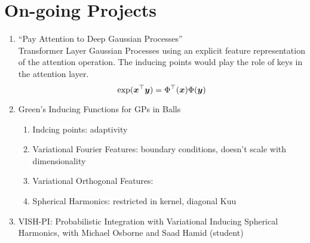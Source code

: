 \section{On-going Projects}

\begin{enumerate}
    \item ``Pay Attention to Deep Gaussian Processes''\\
    Transformer Layer Gaussian Processes using an explicit feature representation of the attention operation. The inducing points would play the role of keys in the attention layer.
    \begin{equation*}
        \exp(\bm{x}^\top \bm{y}) = \Phi^\top(\bm{x}) \Phi(\bm{y})
    \end{equation*}
    \item Green's Inducing Functions for GPs in Balls
    \begin{enumerate}
        \item Indcing points: adaptivity
        \item Variational Fourier Features: boundary conditions, doesn't scale with dimensionality
        \item Variational Orthogonal Features: 
        \item Spherical Harmonics: restricted in kernel, diagonal Kuu
    \end{enumerate}
    \item VISH-PI: Probabilistic Integration with Variational Inducing Spherical Harmonics, with Michael Osborne and Saad Hamid (student)
\end{enumerate}



